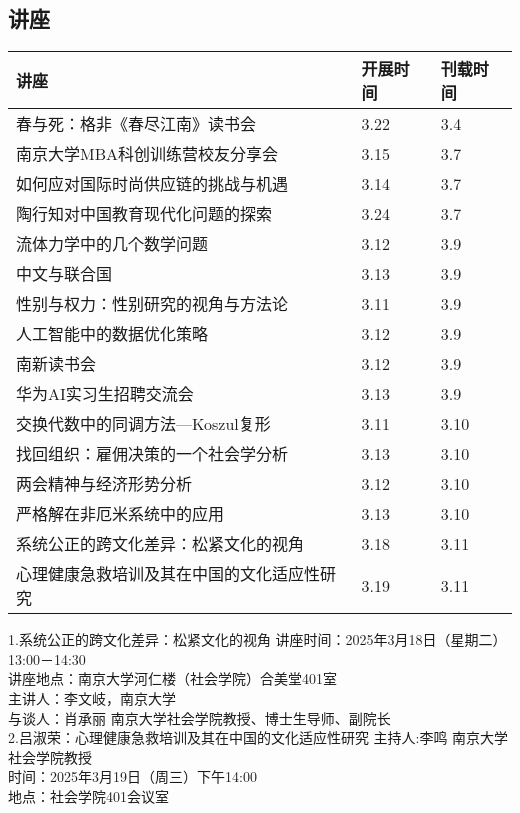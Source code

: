 \documentclass[letterpaper, 12pt]{article}
\begin{document}
\begin{multicols}{2}
\section{讲座}
\begin{tabular}{|>{\centering\arraybackslash}m{}|m{}|m{}|}
    \hline
    讲座 & 开展时间 & 刊载时间\\
    \hline\hline
    春与死：格非《春尽江南》读书会 & 3.22 & 3.4\\\hline
    南京大学MBA科创训练营校友分享会 & 3.15 & 3.7\\\hline
    如何应对国际时尚供应链的挑战与机遇 & 3.14 & 3.7\\\hline
    陶行知对中国教育现代化问题的探索 & 3.24 & 3.7\\\hline
    流体力学中的几个数学问题 & 3.12 & 3.9\\\hline
    中文与联合国 & 3.13 & 3.9\\\hline
    性别与权力：性别研究的视角与方法论 & 3.11 & 3.9\\\hline
    人工智能中的数据优化策略 & 3.12 & 3.9\\\hline
    南新读书会 & 3.12 & 3.9\\\hline
    华为AI实习生招聘交流会 & 3.13 & 3.9\\\hline
    交换代数中的同调方法—Koszul复形 & 3.11 & 3.10\\\hline
    找回组织：雇佣决策的一个社会学分析 & 3.13 & 3.10\\\hline
    两会精神与经济形势分析 & 3.12 & 3.10\\\hline
    严格解在非厄米系统中的应用 & 3.13 & 3.10\\\hline
    系统公正的跨文化差异：松紧文化的视角 & 3.18 & 3.11\\\hline
    心理健康急救培训及其在中国的文化适应性研究 & 3.19 & 3.11\\\hline
\end{tabular}
1.系统公正的跨文化差异：松紧文化的视角
讲座时间：2025年3月18日（星期二）13:00－14:30\\
讲座地点：南京大学河仁楼（社会学院）合美堂401室\\
主讲人：李文岐，南京大学\\
与谈人：肖承丽 南京大学社会学院教授、博士生导师、副院长\\

2.吕淑荣：心理健康急救培训及其在中国的文化适应性研究
主持人:李鸣 南京大学社会学院教授\\
时间：2025年3月19日（周三）下午14:00\\
地点：社会学院401会议室\\


\end{multicols}
\end{document}
